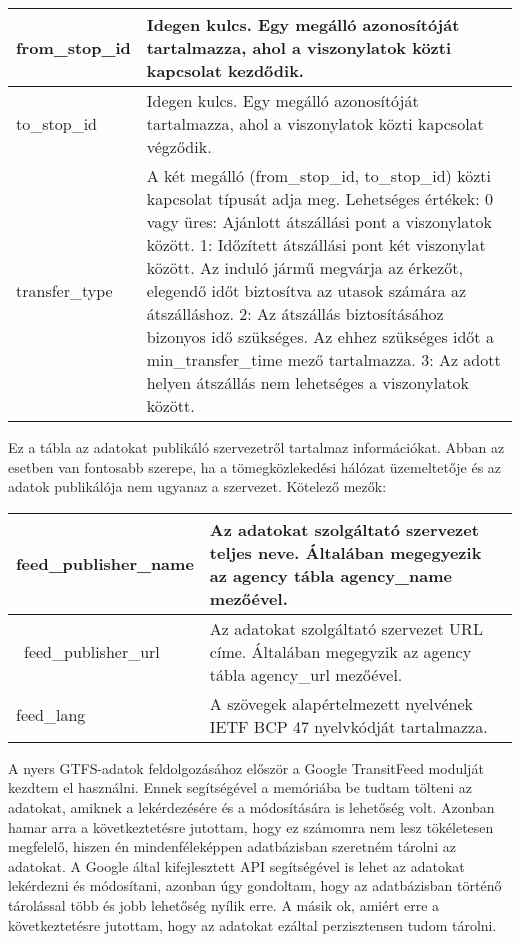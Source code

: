 \begin{tabular}{|p{3cm}|p{10cm}|}
\hline
from\_stop\_id & Idegen kulcs. Egy megálló azonosítóját tartalmazza, ahol a viszonylatok közti kapcsolat kezdődik.  \\
\hline
to\_stop\_id & Idegen kulcs. Egy megálló azonosítóját tartalmazza, ahol a viszonylatok közti kapcsolat végződik. \\
\hline
transfer\_type & A két megálló (from\_stop\_id, to\_stop\_id) közti kapcsolat típusát adja meg.
Lehetséges értékek:
0 vagy üres: Ajánlott átszállási pont a viszonylatok között.
1: Időzített átszállási pont két viszonylat között. Az induló jármű megvárja az érkezőt, elegendő időt biztosítva az utasok számára az átszálláshoz.
2: Az átszállás biztosításához bizonyos idő szükséges. Az ehhez szükséges időt a min\_transfer\_time mező tartalmazza.
3: Az adott helyen átszállás nem lehetséges a viszonylatok között. \\
\hline
\end{tabular}


Ez a tábla az adatokat publikáló szervezetről tartalmaz információkat. Abban az esetben van fontosabb szerepe, ha a tömegközlekedési hálózat üzemeltetője és az adatok publikálója nem ugyanaz a szervezet.
Kötelező mezők:

\begin{tabular}{|p{3cm}|p{10cm}|}
\hline
feed\_publisher\_name & Az adatokat szolgáltató szervezet teljes neve. Általában megegyezik az agency tábla agency\_name mezőével. \\
\hline\
feed\_publisher\_url & Az adatokat szolgáltató szervezet URL címe. Általában megegyzik az agency tábla agency\_url mezőével. \\
\hline
feed\_lang & A szövegek alapértelmezett nyelvének IETF BCP 47 nyelvkódját tartalmazza. \\
\hline
\end{tabular}


A nyers GTFS-adatok feldolgozásához először a Google TransitFeed modulját kezdtem el használni. Ennek segítségével a memóriába be tudtam tölteni az adatokat, amiknek a lekérdezésére és a módosítására is lehetőség volt. Azonban hamar arra a következtetésre jutottam, hogy ez számomra nem lesz tökéletesen megfelelő, hiszen én mindenféleképpen adatbázisban szeretném tárolni az adatokat. A Google által kifejlesztett API segítségével is lehet az adatokat lekérdezni és módosítani, azonban úgy gondoltam, hogy az adatbázisban történő tárolással több és jobb lehetőség nyílik erre. A másik ok, amiért erre a következtetésre jutottam, hogy az adatokat ezáltal perzisztensen tudom tárolni.

